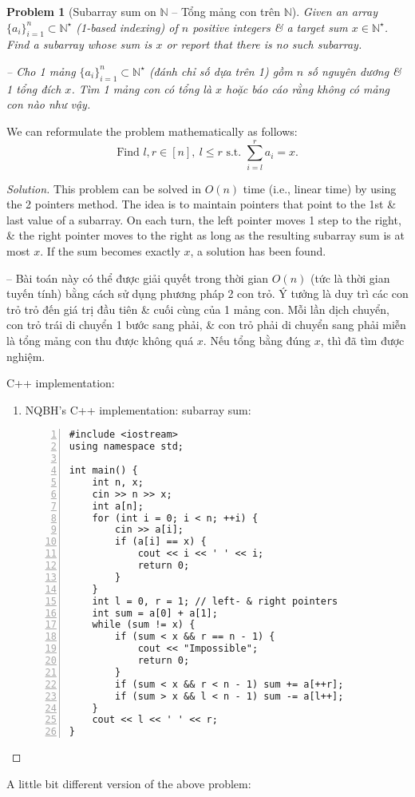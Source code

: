 \documentclass{article}
\newtheorem{problem}{Problem}
\begin{document}
\begin{problem}[Subarray sum on $\mathbb{N}$ -- Tổng mảng con trên $\mathbb{N}$]
    Given an array $\{a_i\}_{i=1}^n\subset\mathbb{N}^\star$ (1-based indexing) of $n$ positive integers \& a target sum $x\in\mathbb{N}^\star$. Find a subarray whose sum is $x$ or report that there is no such subarray.

    -- Cho 1 mảng $\{a_i\}_{i=1}^n\subset\mathbb{N}^\star$ (đánh chỉ số dựa trên 1) gồm $n$ số nguyên dương \& 1 tổng đích $x$. Tìm 1 mảng con có tổng là $x$ hoặc báo cáo rằng không có mảng con nào như vậy.
\end{problem}
We can reformulate the problem mathematically as follows:
\begin{equation*}
    \mbox{Find } l,r\in[n],\ l\le r\mbox{ s.t. }\sum_{i=l}^r a_i = x.
\end{equation*}

\begin{proof}[Solution]
    This problem can be solved in $O(n)$ time (i.e., linear time) by using the 2 pointers method. The idea is to maintain pointers that point to the 1st \& last value of a subarray. On each turn, the left pointer moves 1 step to the right, \& the right pointer moves to the right as long as the resulting subarray sum is at most $x$. If the sum becomes exactly $x$, a solution has been found.

    -- Bài toán này có thể được giải quyết trong thời gian $O(n)$ (tức là thời gian tuyến tính) bằng cách sử dụng phương pháp 2 con trỏ. Ý tưởng là duy trì các con trỏ trỏ đến giá trị đầu tiên \& cuối cùng của 1 mảng con. Mỗi lần dịch chuyển, con trỏ trái di chuyển 1 bước sang phải, \& con trỏ phải di chuyển sang phải miễn là tổng mảng con thu được không quá $x$. Nếu tổng bằng đúng $x$, thì đã tìm được nghiệm.

    C++ implementation:
    \begin{enumerate}
        \item NQBH's C++ implementation: subarray sum:
        \begin{Verbatim}[numbers=left,xleftmargin=0mm]
#include <iostream>
using namespace std;

int main() {
    int n, x;
    cin >> n >> x;
    int a[n];
    for (int i = 0; i < n; ++i) {
        cin >> a[i];
        if (a[i] == x) {
            cout << i << ' ' << i;
            return 0;
        }
    }
    int l = 0, r = 1; // left- & right pointers
    int sum = a[0] + a[1];
    while (sum != x) {
        if (sum < x && r == n - 1) {
            cout << "Impossible";
            return 0;
        }
        if (sum < x && r < n - 1) sum += a[++r];
        if (sum > x && l < n - 1) sum -= a[l++];
    }
    cout << l << ' ' << r;
}
        \end{Verbatim}
    \end{enumerate}
\end{proof}
A little bit different version of the above problem:
\end{document}
